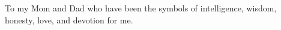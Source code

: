 \vspace*{7cm}
\begin{center}
To my Mom and Dad who have been the symbols of intelligence, wisdom, honesty, love, and devotion for me.  
\end{center}

